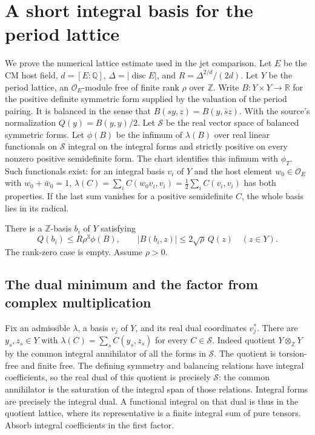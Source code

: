 \section{A short integral basis for the period lattice}
\label{sec:period-basis}

We prove the numerical lattice estimate used in the jet comparison.
Let \(E\) be the CM host field, \(d=[E:\mathbb Q]\),
\(\Delta=|\operatorname{disc}E|\), and \(R=\Delta^{2/d}/(2d)\).
Let \(Y\) be the period lattice, an \(\mathcal O_E\)-module free
of finite rank \(\rho\) over \(\mathbb Z\). Write
\(B:Y\times Y\to\mathbb R\) for the positive definite symmetric
form supplied by the valuation of the period pairing. It is balanced
in the sense that \(B(sy,z)=B(y,\bar s z)\).
With the source's normalization \(Q(y)=B(y,y)/2\). Let
\(\mathcal S\) be the real vector space of balanced symmetric forms.
Let \(\phi(B)\) be the infimum of \(\lambda(B)\) over real linear
functionals on \(\mathcal S\) integral on the integral forms and
strictly positive on every nonzero positive semidefinite form.
The chart identifies this infimum with \(\phi_T\).
Such functionals exist: for an integral basis \(v_i\) of \(Y\) and
the host element \(w_0\in\mathcal O_E\) with \(w_0+\bar w_0=1\),
\(\lambda(C)=\sum_i C(w_0v_i,v_i)=\tfrac12\sum_i C(v_i,v_i)\)
has both properties. If the last sum vanishes for a positive
semidefinite \(C\), the whole basis lies in its radical.

There is a \(\mathbb Z\)-basis \(b_i\) of \(Y\) satisfying
\begin{equation}
  Q(b_i)\le R\rho^3\phi(B),\qquad
  |B(b_i,z)|\le 2\sqrt{\rho}\,Q(z)\quad(z\in Y).
  \label{eq:period-short-basis}
\end{equation}
The rank-zero case is empty. Assume \(\rho>0\).

\subsection{The dual minimum and the factor from complex multiplication}

Fix an admissible \(\lambda\), a basis \(v_j\) of \(Y\), and its
real dual coordinates \(v_j^*\). There are \(y_s,z_s\in Y\) with
\(\lambda(C)=\sum_s C(y_s,z_s)\) for every \(C\in\mathcal S\).
Indeed quotient \(Y\otimes_{\mathbb Z}Y\) by the common integral
annihilator of all the forms in \(\mathcal S\). The quotient is
torsion-free and finite free. The defining symmetry and balancing
relations have integral coefficients, so the real dual of this quotient
is precisely \(\mathcal S\): the common annihilator is the saturation
of the integral span of those relations. Integral forms are precisely
the integral dual. A functional integral on that dual is thus in the
quotient lattice, where its representative is a finite integral sum of
pure tensors. Absorb integral coefficients in the first factor.

